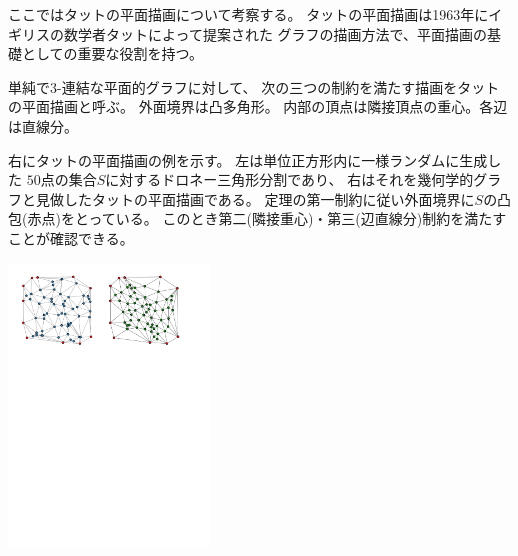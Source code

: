 ここではタットの平面描画について考察する。
タットの平面描画は1963年にイギリスの数学者タットによって提案された
グラフの描画方法で、平面描画の基礎としての重要な役割を持つ。


\begin{definition}[タットの平面描画]
\label{def:tutte_drawing}
単純で$3$-連結な平面的グラフに対して、
次の三つの制約を満たす描画をタットの平面描画と呼ぶ。
外面境界は凸多角形。
内部の頂点は隣接頂点の重心。各辺は直線分。
\end{definition}


\begin{paracol}{2}
右にタットの平面描画の例を示す。
左は単位正方形内に一様ランダムに生成した
$50$点の集合$S$に対するドロネー三角形分割であり、
右はそれを幾何学的グラフと見做したタットの平面描画である。
定理の第一制約に従い外面境界に$S$の凸包(赤点)をとっている。
このとき第二(隣接重心)・第三(辺直線分)制約を満たすことが確認できる。

\switchcolumn
\centering
\includegraphics[width=0.4\textwidth]{figures/delaunay_tutte.pdf}
\end{paracol}



